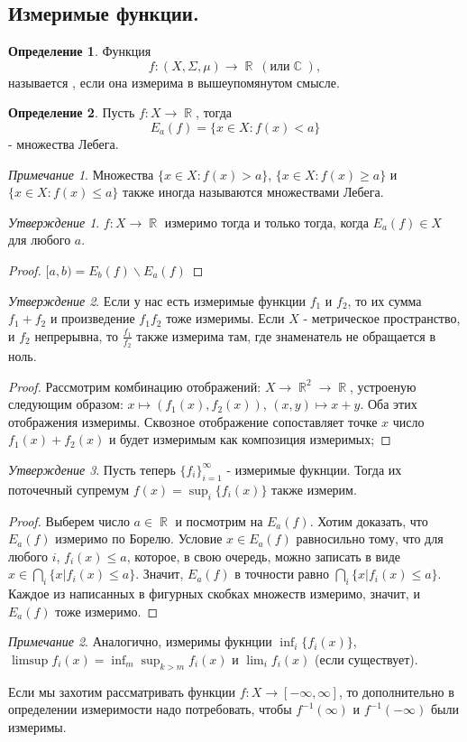 \documentclass[a4paper]{article}
\theoremstyle{indented}
\theoremstyle{definition}
\newtheorem{defn}{Определение}
\theoremstyle{remark}
\newtheorem{remark}{Примечание}
\newtheorem{stat}{Утверждение}
\DeclareMathOperator{\ra}{\rightarrow}
\DeclareMathOperator{\CC}{\mathbb{C}}
\DeclareMathOperator{\RR}{\mathbb{R}}
\begin{document}
\subsection{Измеримые функции.}
\begin{defn}
Функция
\[
f: (X, \Sigma, \mu) \ra \RR \: (или \CC),
\]
называется , если она
измерима в вышеупомянутом смысле. 
\end{defn}
\begin{defn}
Пусть $f: X \ra \RR$, тогда 
\[
E_a(f) = \{x \in X : f(x) < a\} 
\]
- множества Лебега.
\end{defn}
\begin{remark}
Множества $\{x \in X : f(x) > a\}$, $\{x \in X : f(x) \geq a\}$ и $\{x \in X : f(x) \leq a\}$ также иногда называются множествами Лебега.
\end{remark}
\begin{stat}
$f: X \ra \RR$ измеримо тогда и только тогда, когда $E_a(f) \in X$ для любого $a$. 
\end{stat}
\begin{proof}
$[a, b) = E_b(f) \backslash E_a(f)$
\end{proof}
\begin{stat}
Если у нас есть измеримые функции $f_1$ и $f_2$, то их сумма $f_1+f_2$ и произведение $f_1f_2$ тоже измеримы. Если $X$ - метрическое пространство, и $f_2$ непрерывна, то $\frac{f_1}{f_2}$ также измерима там, где знаменатель не обращается в ноль.
\end{stat}
\begin{proof}
Рассмотрим комбинацию отображений: $X \ra \RR^2 \ra \RR$, устроеную следующим образом: $x \mapsto (f_1(x), f_2(x))$, $(x, y) \mapsto x+y$. Оба этих отображения измеримы. Сквозное отображение сопоставляет точке $x$ число $f_1(x)+f_2(x)$ и будет измеримым как композиция измеримых;
\end{proof}
\begin{stat}
Пусть теперь $\{f_i\}_{i=1}^{\infty}$ - измеримые фукнции. Тогда их поточечный супремум $f(x)=\sup_{i} \{f_i(x)\}$ также измерим.
\end{stat}
\begin{proof}
Выберем число $a \in \RR$ и посмотрим на $E_a(f)$. Хотим доказать, что $E_a(f)$ измеримо по Борелю.  
Условие $x \in E_a(f)$ равносильно тому, что для любого $i$, $f_i(x) \leq a$, которое, в свою очередь, можно записать в виде $x \in \bigcap_i \{x | f_i(x) \leq a\}$. Значит, $E_a(f)$ в точности равно $ \bigcap_i \{x | f_i(x) \leq a\}$. Каждое из написанных в фигурных скобках множеств измеримо, значит, и $E_a(f)$ тоже измеримо.
\end{proof}
\begin{remark}
Аналогично, измеримы фукнции $\inf_i \{f_i(x)\}$,  $\limsup{f_i(x)} = \inf_m \sup_{k>m} f_i(x)$ и $\lim_i f_i(x)$ (если существует).
\end{remark}
Если мы захотим рассматривать функции $f: X \ra [-\infty, \infty]$, то дополнительно в определении измеримости надо потребовать, чтобы $f^{-1}(\infty)$ и $f^{-1}(-\infty)$ были измеримы.
 
\end{document}
